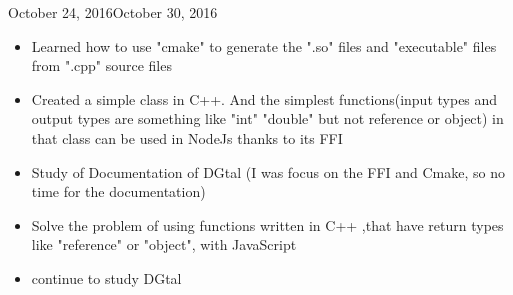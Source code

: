 \begin{fichesuivi}{October 24, 2016}{October 30, 2016}

   \begin{travaileffectue}
     \begin{itemize}
         \item Learned how to use "cmake" to generate the ".so" files and "executable" files from ".cpp" source files
         \item Created a simple class in C++. And the simplest functions(input types and output types are something like "int" "double" but not reference or object) in that class can be used in NodeJs thanks to its FFI
       \end{itemize}
   \end{travaileffectue}

   \begin{travailnoneffectue}
     \begin{itemize}
         \item Study of Documentation of DGtal (I was focus on the FFI and Cmake, so no time for the documentation)
       \end{itemize}
   \end{travailnoneffectue}
   
   \begin{planification}
         \begin{itemize}
         \item Solve the problem of using functions written in C++ ,that have return types like "reference" or "object", with JavaScript
         \item continue to study DGtal
       \end{itemize}
   \end{planification}
\end{fichesuivi}





